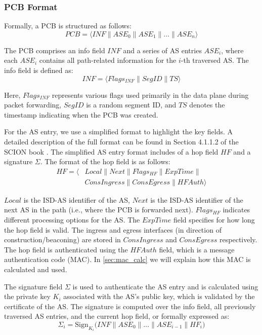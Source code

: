 \subsubsection{PCB Format}
Formally, a PCB is structured as follows:
$$ PCB = \langle INF \parallel ASE_0 \parallel ASE_1 \parallel \ldots \parallel ASE_n \rangle $$

The PCB comprises an info field $INF$ and a series of AS entries $ASE_i$, where each $ASE_i$ contains all path-related information for the $i$-th traversed AS.
The info field is defined as:
$$ INF = \langle Flags_{INF} \parallel SegID \parallel TS \rangle $$

Here, $Flags_{INF}$ represents various flags used primarily in the data plane during packet forwarding, $SegID$ is a random segment ID, and $TS$ denotes the timestamp indicating when the PCB was created.

For the AS entry, we use a simplified format to highlight the key fields.
A detailed description of the full format can be found in Section 4.1.1.2 of the SCION book \cite{Perrig2022}.
The simplified AS entry format includes of a hop field $HF$ and a signature $\Sigma$.
The format of the hop field is as follows:
\begin{align*}
    HF = \langle &Local \parallel Next \parallel Flags_{HF} \parallel ExpTime \parallel \\  
    &ConsIngress \parallel ConsEgress \parallel HFAuth\rangle 
\end{align*}

$Local$ is the ISD-AS identifier of the AS, $Next$ is the ISD-AS identifier of the next AS in the path (i.e., where the PCB is forwarded next).
$Flags_{HF}$ indicates different processing options for the AS.
The $ExpTime$ field specifies for how long the hop field is valid.
The ingress and egress interfaces (in direction of construction/beaconing) are stored in $ConsIngress$ and $ConsEgress$ respectively.
The hop field is authenticated using the $HFAuth$ field, which is a message authentication code (MAC).
In \cref{sec:mac_calc} we will explain how this MAC is calculated and used.

The signature field $\Sigma$ is used to authenticate the AS entry and is calculated using the private key $K_i$ associated with the AS's public key, which is validated by the certificate of the AS.
The signature is computed over the info field, all previously traversed AS entries, and the current hop field, or formally expressed as:
$$\Sigma_i = \text{Sign}_{K_i} \bigl( INF \parallel ASE_0 \parallel \dots \parallel ASE_{i-1} \parallel HF_i \bigr)$$

